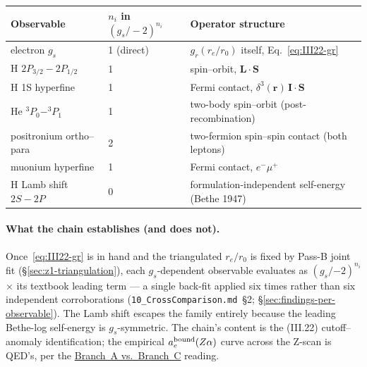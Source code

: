 \begin{center}
\renewcommand{\arraystretch}{1.05}
\begin{tabular}{lll}
\toprule
Observable                              & $n_i$ in $(g_s/{-}2)^{n_i}$ & Operator structure \\
\midrule
electron $g_s$                          & 1 (direct)   & $g_r(r_e/r_0)$ itself, Eq.~\eqref{eq:III22-gr} \\
H $2P_{3/2}{-}2P_{1/2}$                 & 1            & spin--orbit, $\mathbf{L}\!\cdot\!\mathbf{S}$ \\
H 1S hyperfine                          & 1            & Fermi contact, $\delta^3(\mathbf{r})\,\mathbf{I}\!\cdot\!\mathbf{S}$ \\
He ${}^3P_0{-}^3P_1$                    & 1            & two-body spin--orbit (post-recombination) \\
positronium ortho--para                 & 2            & two-fermion spin--spin contact (both leptons) \\
muonium hyperfine                       & 1            & Fermi contact, $e^- \mu^+$ \\
H Lamb shift $2S{-}2P$                  & 0            & formulation-independent self-energy (Bethe 1947) \\
\bottomrule
\end{tabular}
\end{center}

\paragraph{What the chain establishes (and does not).}
Once~\eqref{eq:III22-gr} is in hand and the triangulated $r_e/r_0$ is
fixed by Pass-B joint fit (\S\ref{sec:z1-triangulation}), each
$g_s$-dependent observable evaluates as $(g_s/{-2})^{n_i}$ $\times$ its textbook
leading term --- a single back-fit applied six times rather than six
independent corroborations
(\texttt{10\_CrossComparison.md}~\S2; \S\ref{sec:findings-per-observable}).
The Lamb shift escapes the family entirely because the leading Bethe-log
self-energy is $g_s$-symmetric. The chain's content is the (III.22)
cutoff--anomaly identification; the empirical $a_e^{\rm bound}(Z\alpha)$
curve across the Z-scan is QED's, per the
\hyperref[sec:branch-a-vs-branch-c]{Branch~A vs.~Branch~C} reading.

